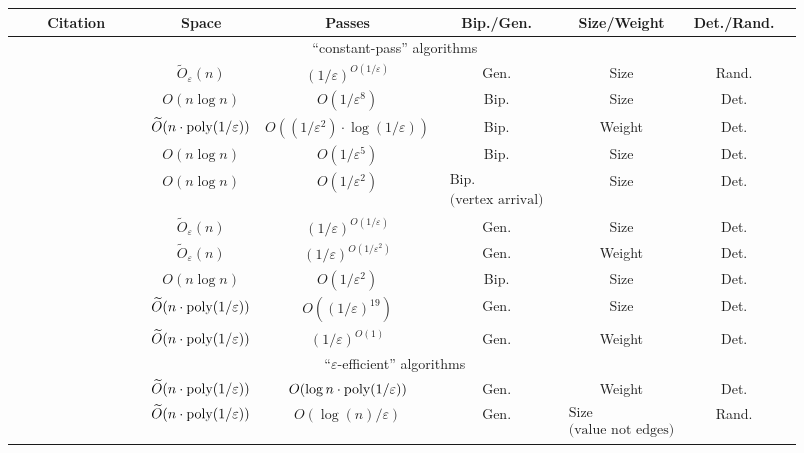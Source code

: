 \documentclass{article}
\newcommand{\Ot}{\widetilde{O}}
\newcommand{\eps}{\varepsilon}
\newcommand{\poly}{\mbox{\rm poly}}
\begin{document}
\begin{table}[h!]

{\smaller
\begin{tabular}{|c | c | c | c | c | c | c |}

 \hline
  ~~~~Citation~~~~ & ~~Space~~ & ~~~~Passes~~~~ & Bip./Gen. & Size/Weight & Det./Rand.  \\ 
  \hline\hline
  \multicolumn{6}{|c|}{``constant-pass'' algorithms} \\
  \hline\hline
  \cite{McGregor05} & $\Ot_{\eps}(n)$ & $(1/\eps)^{O(1/\eps)}$ & Gen. & Size & Rand.  \\
  \hline
  \cite{EggertKS09} & $O(n\log{n})$ & $O(1/\eps^{8})$ & Bip. & Size & Det.  \\
  \hline
  \cite{AhnG11} & $\Ot(n \cdot \poly{(1/\eps)})$ & $O((1/\eps^2) \cdot \log{(1/\eps)})$ & Bip. & Weight & Det. \\ 
  \hline
  \cite{EggertKMS12} & $O(n\log{n})$ & $O(1/\eps^{5})$  & Bip. & Size & Det. \\
  \hline
  \cite{Kapralov13} & $O(n\log{n})$ & $O(1/\eps^2)$ & {\large $\substack{\text{Bip.} \\ \text{(vertex arrival)}}$} & Size & Det. \\
  \hline
  \cite{Tirodkar18} & $\Ot_{\eps}(n)$ & $(1/\eps)^{O(1/\eps)}$ & Gen. & Size & Det. \\
  \hline
  \cite{GamlathKMS19} & $\Ot_{\eps}(n)$ & $(1/\eps)^{O(1/\eps^2)}$ & Gen. & Weight & Det. \\
  \hline
  \cite{AssadiLT21} & $O(n\log{n})$ & $O(1/\eps^2)$ & Bip. & Size & Det. \\
    \hline
  \cite{FischerMU22} & $\Ot(n \cdot \poly{(1/\eps)})$ & $O((1/\eps)^{19})$ & Gen. & Size & Det. \\
  \hline
  \cite{HuangS23} & $\Ot(n \cdot \poly{(1/\eps)})$ & ${(1/\eps)^{O(1)}}$  & Gen. & Weight & Det. \\
  \hline\hline
  \multicolumn{6}{|c|}{``$\eps$-efficient'' algorithms} \\
  \hline\hline
  \cite{AhnG11} & $\Ot(n \cdot \poly{(1/\eps)})$ & $O(\log{n} \cdot \poly{(1/\eps)})$ & Gen. & Weight & Det. \\
\hline
  \cite{AhnG11b} & $\Ot(n \cdot \poly{(1/\eps)})$ & $O(\log{\!(n)}/\eps)$ & Gen. & {\large $\substack{\text{Size} \\ \text{(value not edges)}}$} & Rand. \\

\end{tabular}}
\end{table}
\end{document}
